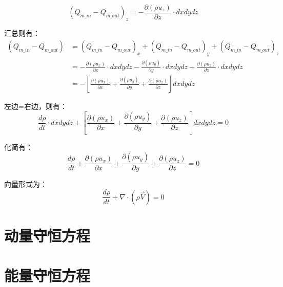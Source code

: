 \documentclass[a4paper,12pt]{article}
\begin{document}
	\[
	(Q_{m\_in}-Q_{m\_out})_{z}=-\frac{\partial (\rho u_{z})}{\partial z} \cdot dxdydz
	\] \par
	汇总则有：
	\[
	\begin{aligned}
	(Q_{m\_in}-Q_{m\_out}) & =(Q_{m\_in}-Q_{m\_out})_{x}+(Q_{m\_in}-Q_{m\_out})_{y}+(Q_{m\_in}-Q_{m\_out})_{z} \\ &
	=-\frac{\partial (\rho u_{x})}{\partial x} \cdot dxdydz-\frac{\partial (\rho u_{y})}{\partial y} \cdot dxdydz-\frac{\partial (\rho u_{z})}{\partial z} \cdot dxdydz \\ &
	=-[\frac{\partial (\rho u_{x})}{\partial x}+\frac{\partial (\rho u_{y})}{\partial y}+\frac{\partial (\rho u_{z})}{\partial z}]dxdydz
	\end{aligned}
	\]

	左边=右边，则有：
	\[
		\frac{d\rho}{dt} \cdot dxdydz +[\frac{\partial (\rho u_{x})}{\partial x}+\frac{\partial (\rho u_{y})}{\partial y}+\frac{\partial (\rho u_{z})}{\partial z}]dxdydz=0
	\] \par
	化简有：
	\begin{equation}
			\frac{d\rho}{dt} + \frac{\partial (\rho u_{x})}{\partial x}+\frac{\partial (\rho u_{y})}{\partial y}+\frac{\partial (\rho u_{z})}{\partial z}=0
	\end{equation} \par
	向量形式为：
	\[
\frac{d\rho}{dt} +\nabla \cdot (\rho \vec{V})=0
\] \par

\section{动量守恒方程}

\section{能量守恒方程}
\end{document}

